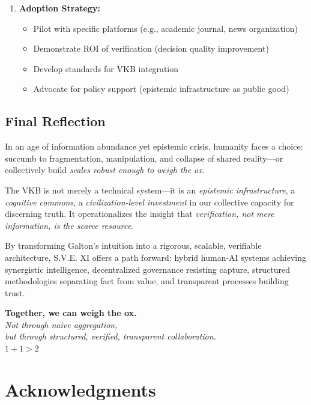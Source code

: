 \documentclass[11pt,a4paper]{article}
\theoremstyle{definition}
\theoremstyle{remark}
\newcommand{\VKB}{\textsc{VKB}}
\begin{document}
\begin{enumerate}
    \item \textbf{Adoption Strategy:}
    \begin{itemize}
        \item Pilot with specific platforms (e.g., academic journal, news organization)
        \item Demonstrate ROI of verification (decision quality improvement)
        \item Develop standards for \VKB{} integration
        \item Advocate for policy support (epistemic infrastructure as public good)
    \end{itemize}
\end{enumerate}

\subsection{Final Reflection}

In an age of information abundance yet epistemic crisis, humanity faces a choice: succumb to fragmentation, manipulation, and collapse of shared reality—or collectively build \textit{scales robust enough to weigh the ox}.

The \VKB{} is not merely a technical system—it is an \textit{epistemic infrastructure}, a \textit{cognitive commons}, a \textit{civilization-level investment} in our collective capacity for discerning truth. It operationalizes the insight that \textit{verification, not mere information, is the scarce resource}.

By transforming Galton's intuition into a rigorous, scalable, verifiable architecture, S.V.E. XI offers a path forward: hybrid human-AI systems achieving synergistic intelligence, decentralized governance resisting capture, structured methodologies separating fact from value, and transparent processes building trust.

\begin{center}
\Large
\textbf{Together, we can weigh the ox.}\\[0.5em]
\normalsize
\textit{Not through naive aggregation,\\
but through structured, verified, transparent collaboration.}\\[1em]
\large
$1 + 1 > 2$
\end{center}

\section*{Acknowledgments}
\end{document}
